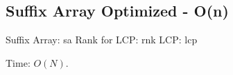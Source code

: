 \subsection{Suffix Array Optimized - O(n)}

Suffix Array: sa
Rank for LCP: rnk
LCP: lcp

Time: $O(N)$.
